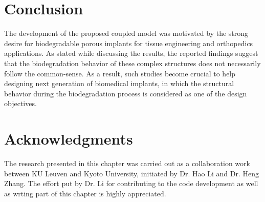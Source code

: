 \section{Conclusion}

The development of the proposed coupled model was motivated by the strong desire for biodegradable porous implants for tissue engineering and orthopedics applications. As stated while discussing the results, the reported findings suggest that the biodegradation behavior of these complex structures does not necessarily follow the common-sense. As a result, such studies become crucial to help designing next generation of biomedical implants, in which the structural behavior during the biodegradation process is considered as one of the design objectives.


\section{Acknowledgments}

The research presented in this chapter was carried out as a collaboration work between KU Leuven and Kyoto University, initiated by Dr. Hao Li and Dr. Heng Zhang. The effort put by Dr. Li for contributing to the code development as well as wrting part of this chapter is highly appreciated.




\cleardoublepage


